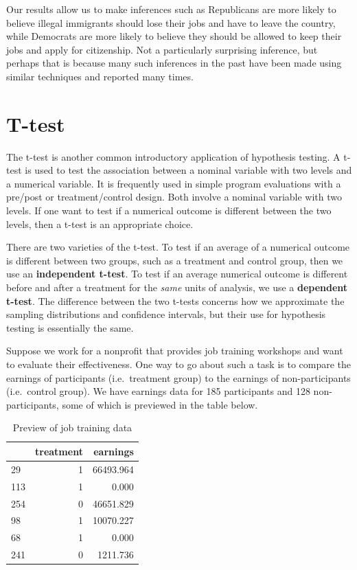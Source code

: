 \documentclass[
]{book}
\begin{document}
Our results allow us to make inferences such as Republicans are more likely to believe illegal immigrants should lose their jobs and have to leave the country, while Democrats are more likely to believe they should be allowed to keep their jobs and apply for citizenship. Not a particularly surprising inference, but perhaps that is because many such inferences in the past have been made using similar techniques and reported many times.

\hypertarget{t-test}{%
\section{T-test}\label{t-test}}

The t-test is another common introductory application of hypothesis testing. A t-test is used to test the association between a nominal variable with two levels and a numerical variable. It is frequently used in simple program evaluations with a pre/post or treatment/control design. Both involve a nominal variable with two levels. If one want to test if a numerical outcome is different between the two levels, then a t-test is an appropriate choice.

There are two varieties of the t-test. To test if an average of a numerical outcome is different between two groups, such as a treatment and control group, then we use an \textbf{independent t-test}. To test if an average numerical outcome is different before and after a treatment for the \emph{same} units of analysis, we use a \textbf{dependent t-test}. The difference between the two t-tests concerns how we approximate the sampling distributions and confidence intervals, but their use for hypothesis testing is essentially the same.

Suppose we work for a nonprofit that provides job training workshops and want to evaluate their effectiveness. One way to go about such a task is to compare the earnings of participants (i.e.~treatment group) to the earnings of non-participants (i.e.~control group). We have earnings data for 185 participants and 128 non-participants, some of which is previewed in the table below.

\begin{table}

\caption{\label{tab:jobtraindata}Preview of job training data}
\centering
\begin{tabular}[t]{l|r|r}
\hline
  & treatment & earnings\\
\hline
29 & 1 & 66493.964\\
\hline
113 & 1 & 0.000\\
\hline
254 & 0 & 46651.829\\
\hline
98 & 1 & 10070.227\\
\hline
68 & 1 & 0.000\\
\hline
241 & 0 & 1211.736\\
\hline
\end{tabular}
\end{table}
\end{document}
